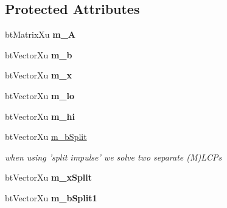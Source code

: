 \subsection*{Protected Attributes}
\begin{DoxyCompactItemize}
\item 
\hypertarget{classbt_m_l_c_p_solver_ab19d782b7687c2c0598a26678a904c3d}{bt\+Matrix\+Xu {\bfseries m\+\_\+\+A}}\label{classbt_m_l_c_p_solver_ab19d782b7687c2c0598a26678a904c3d}

\item 
\hypertarget{classbt_m_l_c_p_solver_a102a9cbe5333f818bd57ab58a61c9fa3}{bt\+Vector\+Xu {\bfseries m\+\_\+b}}\label{classbt_m_l_c_p_solver_a102a9cbe5333f818bd57ab58a61c9fa3}

\item 
\hypertarget{classbt_m_l_c_p_solver_a79ad61721583b308de8be07cd33e67ae}{bt\+Vector\+Xu {\bfseries m\+\_\+x}}\label{classbt_m_l_c_p_solver_a79ad61721583b308de8be07cd33e67ae}

\item 
\hypertarget{classbt_m_l_c_p_solver_ae7a49a4a3ef55eadd59ec64a2d2dce0d}{bt\+Vector\+Xu {\bfseries m\+\_\+lo}}\label{classbt_m_l_c_p_solver_ae7a49a4a3ef55eadd59ec64a2d2dce0d}

\item 
\hypertarget{classbt_m_l_c_p_solver_aaa4243bdf7468736d75c9da113153832}{bt\+Vector\+Xu {\bfseries m\+\_\+hi}}\label{classbt_m_l_c_p_solver_aaa4243bdf7468736d75c9da113153832}

\item 
\hypertarget{classbt_m_l_c_p_solver_a9c1feb6855fa296c8ca582842f8e4fe3}{bt\+Vector\+Xu \hyperlink{classbt_m_l_c_p_solver_a9c1feb6855fa296c8ca582842f8e4fe3}{m\+\_\+b\+Split}}\label{classbt_m_l_c_p_solver_a9c1feb6855fa296c8ca582842f8e4fe3}

\begin{DoxyCompactList}\small\item\em when using 'split impulse' we solve two separate (M)L\+C\+Ps \end{DoxyCompactList}\item 
\hypertarget{classbt_m_l_c_p_solver_a87e493a2efd02e6ec58cdfd6806fc01d}{bt\+Vector\+Xu {\bfseries m\+\_\+x\+Split}}\label{classbt_m_l_c_p_solver_a87e493a2efd02e6ec58cdfd6806fc01d}

\item 
\hypertarget{classbt_m_l_c_p_solver_a2ab2e9fed2b0d44ec90d4e4b430b9af5}{bt\+Vector\+Xu {\bfseries m\+\_\+b\+Split1}}\label{classbt_m_l_c_p_solver_a2ab2e9fed2b0d44ec90d4e4b430b9af5}


\end{DoxyCompactItemize}
